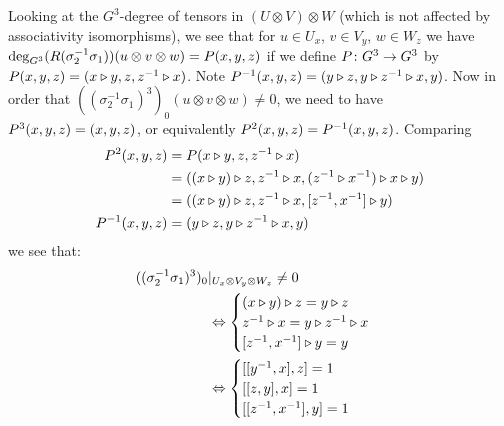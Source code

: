 \documentclass[11pt]{book}
\theoremstyle{Rem}
\theoremstyle{definition}
\numberwithin{equation}{section}
\newcommand\hit{\triangleright}
\newcommand\inv{^{-1}}
\newcommand\ot{\otimes}
\begin{document}
Looking at the $G^3$-degree of tensors in $(U\ot V)\ot W$ (which is not affected by associativity isomorphisms), we see that for $u\in U_x$, $v\in V_y$, $w\in W_z$ we have
$\deg_{G^3}(R(\sigma_2\inv\sigma_1))(u\ot v\ot w)=\Pe(x,y,z)$ if we define $P\colon G^3\to G^3$ by $\Pe(x,y,z)=(x\hit y,z,z\inv\hit x)$. Note $\Pe\inv(x,y,z)=(y\hit z,y\hit z\inv\hit x,y)$. Now in order that $((\sigma_2\inv\sigma_1)^3)_0(u\ot v\ot w)\neq 0$, we need to have $P^3(x,y,z)=(x,y,z)$, or equivalently $\Pe^2(x,y,z)=\Pe\inv(x,y,z)$. Comparing
\begin{align*}
  \Pe^2(x,y,z)&=\Pe(x\hit y,z,z\inv\hit x)\\
            &=((x\hit y)\hit z,z\inv\hit x,(z\inv\hit x\inv)\hit x\hit y)\\
            &=((x\hit y)\hit z,z\inv\hit x,[z\inv,x\inv]\hit y)\\
  \Pe\inv(x,y,z)&=(y\hit z,y\hit z\inv\hit x,y)
\end{align*}
we see that:
\begin{align}
  ((\sigma_2\inv\sigma_1)^3)_0&|_{U_x\ot V_y\ot W_z}\neq 0\notag\\
                            & \Leftrightarrow
                              \begin{cases}(x\hit y)\hit z=y\hit z\\
                                z\inv\hit x=y\hit z\inv\hit x\\
                                [z\inv,x\inv]\hit y=y
                              \end{cases}\notag\\
                            &\Leftrightarrow\label{eq:condition0}
                              \begin{cases}[[y\inv,x],z]=1\\
                                [[z,y],x]=1\\
                                [[z\inv,x\inv],y]=1
                              \end{cases}
\end{align}
\end{document}
